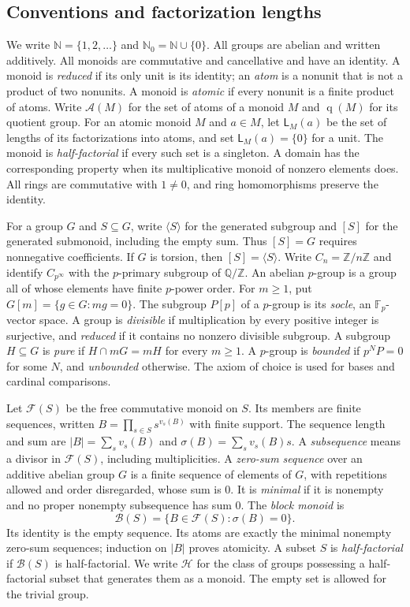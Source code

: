 \documentclass[11pt,reqno]{amsart}
\numberwithin{equation}{section}
\theoremstyle{definition}
\theoremstyle{remark}
\newcommand{\Z}{\mathbb Z}
\newcommand{\Q}{\mathbb Q}
\newcommand{\N}{\mathbb N}
\newcommand{\Nzero}{\mathbb N_0}
\newcommand{\HF}{\mathcal H}
\newcommand{\B}{\mathcal B}
\newcommand{\F}{\mathcal F}
\newcommand{\A}{\mathcal A}
\newcommand{\LL}{\mathsf L}
\DeclareMathOperator{\q}{q}
\begin{document}
\subsection{Conventions and factorization lengths}

We write $\N=\{1,2,\ldots\}$ and $\Nzero=\N\cup\{0\}$.
All groups are abelian and written additively. All monoids are
commutative and cancellative and have an identity. A monoid is
\emph{reduced} if its only unit is its identity; an \emph{atom} is
a nonunit that is not a product of two nonunits. A monoid is
\emph{atomic} if every nonunit is a finite product of atoms.
Write $\A(M)$ for the set of atoms of a monoid $M$ and $\q(M)$
for its quotient group. For an atomic monoid $M$ and $a\in M$,
let $\LL_M(a)$ be the set
of lengths of its factorizations into atoms, and set
$\LL_M(a)=\{0\}$ for a unit. The monoid is \emph{half-factorial}
if every such set is a singleton. A domain has the corresponding
property when its multiplicative monoid of nonzero elements does.
All rings are commutative with $1\ne0$, and ring homomorphisms
preserve the identity.

For a group $G$ and $S\subseteq G$, write $\langle S\rangle$ for
the generated subgroup and $[S]$ for the generated submonoid,
including the empty sum. Thus $[S]=G$ requires nonnegative
coefficients. If $G$ is torsion, then $[S]=\langle S\rangle$.
Write $C_n=\Z/n\Z$ and identify $C_{p^\infty}$ with the
$p$-primary subgroup of $\Q/\Z$. An abelian $p$-group is a group
all of whose elements have finite $p$-power order. For $m\ge1$,
put $G[m]=\{g\in G:mg=0\}$. The subgroup $P[p]$ of a $p$-group
is its \emph{socle}, an $\mathbb F_p$-vector space.
A group is \emph{divisible} if multiplication by every positive
integer is surjective, and \emph{reduced} if it contains no nonzero
divisible subgroup. A subgroup $H\subseteq G$ is \emph{pure} if
$H\cap mG=mH$ for every $m\ge1$. A $p$-group is \emph{bounded}
if $p^NP=0$ for some $N$, and \emph{unbounded} otherwise.
The axiom of choice is used for bases and cardinal comparisons.

Let $\F(S)$ be the free commutative monoid on $S$. Its members
are finite sequences, written $B=\prod_{s\in S}s^{v_s(B)}$ with
finite support. The sequence length and sum are
$|B|=\sum_s v_s(B)$ and $\sigma(B)=\sum_s v_s(B)s$.
A \emph{subsequence} means a divisor in $\F(S)$, including multiplicities. A \emph{zero-sum sequence} over an additive abelian group $G$ is a finite sequence of elements of $G$, with repetitions allowed and order disregarded, whose sum is $0$. It is \emph{minimal} if it is nonempty and no proper nonempty subsequence has sum $0$.
The \emph{block monoid} is
\[
 \B(S)=\{B\in\F(S):\sigma(B)=0\}.
\]
Its identity is the empty sequence. Its atoms are exactly the
minimal nonempty zero-sum sequences; induction on $|B|$ proves
atomicity. A subset $S$ is \emph{half-factorial} if $\B(S)$ is
half-factorial. We write $\HF$ for the class of groups possessing
a half-factorial subset that generates them as a monoid.
The empty set is allowed for the trivial group.
\end{document}
